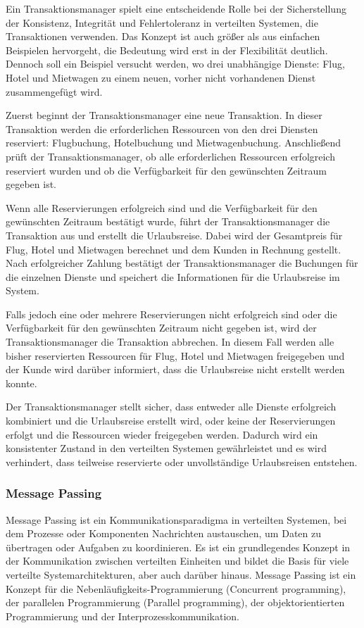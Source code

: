 \documentclass[../vs-script-first-v01.tex]{subfiles}
\begin{document}
Ein Transaktionsmanager spielt eine entscheidende Rolle bei der Sicherstellung der Konsistenz, Integrität und Fehlertoleranz in verteilten Systemen, die Transaktionen verwenden. Das Konzept ist auch größer als aus einfachen Beispielen hervorgeht, die Bedeutung wird erst in der Flexibilität  deutlich. Dennoch soll ein Beispiel versucht werden, wo drei unabhängige Dienste: Flug, Hotel und Mietwagen zu einem neuen, vorher nicht vorhandenen Dienst zusammengefügt wird. 

Zuerst beginnt der Transaktionsmanager eine neue Transaktion. In dieser Transaktion werden die erforderlichen Ressourcen von den drei Diensten reserviert: Flugbuchung, Hotelbuchung und Mietwagenbuchung. Anschließend prüft der Transaktionsmanager, ob alle erforderlichen Ressourcen erfolgreich reserviert wurden und ob die Verfügbarkeit für den gewünschten Zeitraum gegeben ist.

Wenn alle Reservierungen erfolgreich sind und die Verfügbarkeit für den gewünschten Zeitraum bestätigt wurde, führt der Transaktionsmanager die Transaktion aus und erstellt die Urlaubsreise. Dabei wird der Gesamtpreis für Flug, Hotel und Mietwagen berechnet und dem Kunden in Rechnung gestellt. Nach erfolgreicher Zahlung bestätigt der Transaktionsmanager die Buchungen für die einzelnen Dienste und speichert die Informationen für die Urlaubsreise im System.

Falls jedoch eine oder mehrere Reservierungen nicht erfolgreich sind oder die Verfügbarkeit für den gewünschten Zeitraum nicht gegeben ist, wird der Transaktionsmanager die Transaktion abbrechen. In diesem Fall werden alle bisher reservierten Ressourcen für Flug, Hotel und Mietwagen freigegeben und der Kunde wird darüber informiert, dass die Urlaubsreise nicht erstellt werden konnte.

Der Transaktionsmanager stellt sicher, dass entweder alle Dienste erfolgreich kombiniert und die Urlaubsreise erstellt wird, oder keine der Reservierungen erfolgt und die Ressourcen wieder freigegeben werden. Dadurch wird ein konsistenter Zustand in den verteilten Systemen gewährleistet und es wird verhindert, dass teilweise reservierte oder unvollständige Urlaubsreisen entstehen.
\subsubsection{Message Passing}
Message Passing ist ein Kommunikationsparadigma in verteilten Systemen, bei dem Prozesse oder Komponenten Nachrichten austauschen, um Daten zu übertragen oder Aufgaben zu koordinieren. Es ist ein grundlegendes Konzept in der Kommunikation zwischen verteilten Einheiten und bildet die Basis für viele verteilte Systemarchitekturen, aber auch darüber hinaus.
Message Passing ist ein Konzept für die Nebenläufigkeits-Programmierung (Concurrent programming), der parallelen Programmierung (Parallel programming), der objektorientierten Programmierung und der Interprozesskommunikation.
\end{document}
